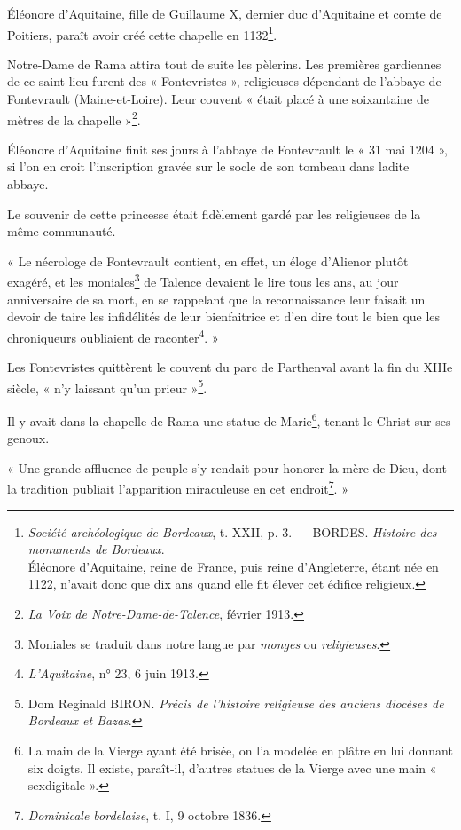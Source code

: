 Éléonore d'Aquitaine, fille de Guillaume X, dernier duc d'Aquitaine et comte de Poitiers, paraît avoir créé cette chapelle en 1132\footnote{\textit{Société archéologique de Bordeaux}, t. XXII, p. 3. — BORDES. \textit{Histoire des monuments de Bordeaux}.\\Éléonore d'Aquitaine, reine de France, puis reine d'Angleterre, étant née en 1122, n'avait donc que dix ans quand elle fit élever cet édifice religieux.}.

Notre-Dame de Rama attira tout de suite les pèlerins. Les premières gardiennes de ce saint lieu furent des « Fontevristes », religieuses dépendant de l'abbaye de Fontevrault (Maine-et-Loire). Leur couvent « était placé à une soixantaine de mètres de la chapelle »\footnote{\textit{La Voix de Notre-Dame-de-Talence}, février 1913.}.

Éléonore d'Aquitaine finit ses jours à l'abbaye de Fontevrault le « 31 mai 1204 », si l'on en croit l'inscription gravée sur le socle de son tombeau dans ladite abbaye.

Le souvenir de cette princesse était fidèlement gardé par les religieuses de la même communauté.

« Le nécrologe de Fontevrault contient, en effet, un éloge d'Alienor plutôt exagéré, et les moniales\footnote{Moniales se traduit dans notre langue par \textit{monges} ou \textit{religieuses}.} de Talence devaient le lire tous les ans, au jour anniversaire de sa mort, en se rappelant que la reconnaissance leur faisait un devoir de taire les infidélités de leur bienfaitrice et d'en dire tout le bien que les chroniqueurs oubliaient de raconter\footnote{\textit{L'Aquitaine}, n° 23, 6 juin 1913.}. »

Les Fontevristes quittèrent le couvent du parc de Parthenval avant la fin du XIIIe siècle, « n'y laissant qu'un prieur »\footnote{Dom Reginald BIRON. \textit{Précis de l'histoire religieuse des anciens diocèses de Bordeaux et Bazas}.}. 

Il y avait dans la chapelle de Rama une statue de Marie\footnote{La main de la Vierge ayant été brisée, on l'a modelée en plâtre en lui donnant six doigts. Il existe, paraît-il, d'autres statues de la Vierge avec une main « sexdigitale ».}, tenant le Christ sur ses genoux.

« Une grande affluence de peuple s'y rendait pour honorer la mère de Dieu, dont la tradition publiait l'apparition miraculeuse en cet endroit\footnote{\textit{Dominicale bordelaise}, t. I\ier{}, 9 octobre 1836.}. »

